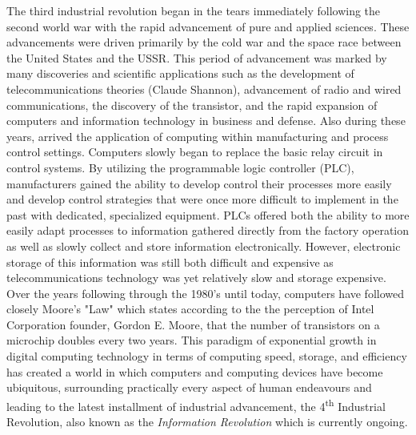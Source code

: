 The third industrial revolution began in the tears immediately following the second world war with the rapid advancement of pure and applied sciences.  These advancements were driven primarily by the cold war and the space race between the United States and the USSR.  This period of advancement was marked by many discoveries and scientific applications such as the development of telecommunications theories (Claude Shannon), advancement of radio and wired communications, the discovery of the transistor, and the rapid expansion of computers and information technology in business and defense.  Also during these years, arrived the application of computing within manufacturing and process control settings. Computers slowly began to replace the basic relay circuit in control systems.  By utilizing the programmable logic controller (PLC), manufacturers gained the ability to develop control their processes more easily and develop control strategies that were once more difficult to implement in the past with dedicated, specialized equipment.  PLCs offered both the ability to more easily adapt processes to information gathered directly from the factory operation as well as slowly collect and store information electronically.  However, electronic storage of this information was still both difficult and expensive as telecommunications technology was yet relatively slow and storage expensive.  Over the years following through the 1980's until today, computers have followed closely Moore's "Law" which states according to the the perception of Intel Corporation founder, Gordon E. Moore, that the number of transistors on a microchip doubles every two years.  This paradigm of exponential growth in digital computing technology in terms of computing speed, storage, and efficiency has created a world in which computers and computing devices have become ubiquitous, surrounding practically every aspect of human endeavours and leading to the latest installment of industrial advancement, the 4\textsuperscript{th} Industrial Revolution, also known as the \textit{Information Revolution} which is currently ongoing. 

